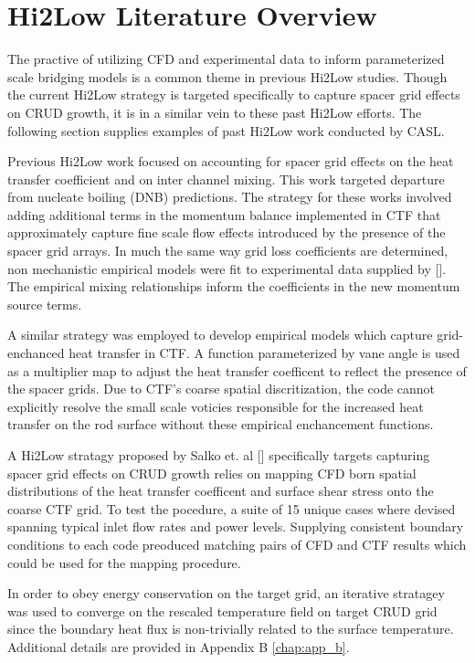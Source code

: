 \section{Hi2Low Literature Overview}

The practive of utilizing CFD and experimental data to inform parameterized scale bridging models is a common theme in previous Hi2Low studies.  Though the current Hi2Low strategy is targeted specifically to capture spacer grid effects on CRUD growth, it is in a similar vein to these past Hi2Low efforts.  The following section supplies examples of past Hi2Low work conducted by CASL.

Previous Hi2Low work focused on accounting for spacer grid effects on the heat transfer coefficient and on inter channel mixing.  This work targeted departure from nucleate boiling (DNB) predictions.  The strategy for these works involved adding additional terms in the momentum balance implemented in CTF that approximately capture fine scale flow effects introduced by the presence of the spacer grid arrays. In much the same way grid loss coefficients are determined, non mechanistic empirical models were fit to experimental data supplied by [].  The empirical mixing relationships inform the coefficients in the new momentum source terms.

A similar strategy was employed to develop empirical models which capture grid-enchanced heat transfer in CTF.  A function parameterized by vane angle is used as a multiplier map to adjust the heat transfer coefficent to reflect the presence of the spacer grids.  Due to CTF's coarse spatial discritization, the code cannot explicitly resolve the small scale voticies responsible for the increased heat transfer on the rod surface without these empirical enchancement functions. 

A Hi2Low stratagy proposed by Salko et. al [] specifically targets capturing spacer grid effects on CRUD growth  relies on mapping CFD born spatial distributions of the heat transfer coefficent and surface shear stress onto the coarse CTF grid.    To test the pocedure, a suite of 15 unique cases where devised spanning typical inlet flow rates and power levels.  Supplying consistent boundary conditions to each code preoduced matching pairs of CFD and CTF results which could be used for the mapping procedure.

In order to obey energy conservation on the target grid,  an iterative stratagey was used to converge on the rescaled temperature field on target CRUD grid since the boundary heat flux is non-trivially related to the surface temperature.  Additional details are provided in Appendix B \ref{chap:app_b}.

